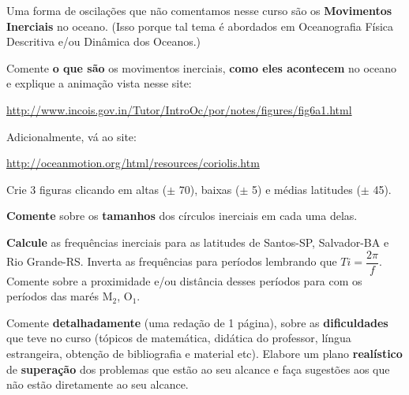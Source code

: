 \documentclass[letterpaper,portuguese,12pt,pdftex]{exam}
\begin{document}
\begin{questions}
\question[4]
Uma forma de oscilações que não comentamos nesse curso são os {\bf Movimentos
Inerciais} no oceano.  (Isso porque tal tema é abordados em Oceanografia Física
Descritiva e/ou Dinâmica dos Oceanos.)

Comente {\bf o que são} os movimentos inerciais, {\bf como eles acontecem}
no oceano e explique a animação vista nesse site:

\url{http://www.incois.gov.in/Tutor/IntroOc/por/notes/figures/fig6a1.html}

Adicionalmente, vá ao site:

\url{http://oceanmotion.org/html/resources/coriolis.htm}

Crie 3 figuras clicando em altas ($\pm$ 70\textdegree{}), baixas
($\pm$ 5\textdegree{}) e médias latitudes ($\pm$ 45\textdegree{}).

{\bf Comente} sobre os {\bf tamanhos} dos círculos inerciais em cada uma delas.

{\bf Calcule} as frequências inerciais para as latitudes de Santos-SP, Salvador-BA e
Rio Grande-RS.  Inverta as frequências para períodos lembrando que
$Ti = \dfrac{2\pi}{f}$.  Comente sobre a proximidade e/ou distância desses
períodos para com os períodos das marés M$_2$, O$_1$.

\question[1]
Comente {\bf detalhadamente} (uma redação de 1 página), sobre as
{\bf dificuldades} que teve no curso (tópicos de matemática, didática do
professor, língua estrangeira, obtenção de bibliografia e material etc).
Elabore um plano {\bf realístico} de {\bf superação} dos problemas que estão
ao seu alcance e faça sugestões aos que não estão diretamente ao seu alcance.

\end{questions}
\end{document}
